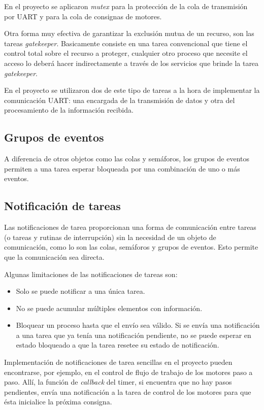 \documentclass{IEEEtran}
\begin{document}
En el proyecto se aplicaron \textit{mutex} para la protección de la cola de transmisión por UART y para la cola de consignas de motores.

Otra forma muy efectiva de garantizar la exclusión mutua de un recurso, son las tareas \textit{gatekeeper}. Basicamente consiste en una tarea convencional que tiene el control total sobre el recurso a proteger, cualquier otro proceso que necesite el acceso lo deberá hacer indirectamente a través de los servicios que brinde la tarea \textit{gatekeeper}. 

En el proyecto se utilizaron dos de este tipo de tareas a la hora de implementar la comunicación UART: una encargada de la transmisión de datos y otra del procesamiento de la información recibida.

\subsection{Grupos de eventos}
A diferencia de otros objetos como las colas y semáforos, los grupos de eventos permiten a una tarea esperar bloqueada por una combinación de uno o más eventos.

\subsection{Notificación de tareas}
Las notificaciones de tarea proporcionan una forma de comunicación entre tareas (o tareas y rutinas de interrupción) sin la necesidad de un objeto de comunicación, como lo son las colas, semáforos y grupos de eventos. Esto permite que la comunicación sea directa.

Algunas limitaciones de las notificaciones de tareas son:

\begin{itemize}
    \item Solo se puede notificar a una única tarea.
    \item No se puede acumular múltiples elementos con información.
    \item Bloquear un proceso hasta que el envío sea válido. Si se envía una notificación a una tarea que ya tenía una notificación pendiente, no se puede esperar en estado bloqueado a que la tarea resetee su estado de notificación.
\end{itemize}

Implementación de notificaciones de tarea sencillas en el proyecto pueden encontrarse, por ejemplo, en el control de flujo de trabajo de los motores paso a paso. Allí, la función de \textit{callback} del timer, si encuentra que no hay pasos pendientes, envía una notificación a la tarea de control de los motores para que ésta inicialice la próxima consigna.
\end{document}
